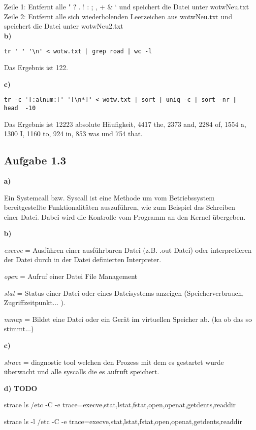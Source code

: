 \documentclass[a4paper,graphics,11pt]{article}
\newcommand{\aufgabe}[1]{\subsection*{Aufgabe #1}}
\begin{document}
Zeile 1: Entfernt alle " ? . ! : ; , +  \& ‘  und speichert die Datei unter wotwNeu.txt\\
Zeile 2: Entfernt alle sich wiederholenden Leerzeichen aus wotwNeu.txt und speichert die Datei unter wotwNeu2.txt\\


\textbf{b)}

\begin{verbatim}
tr ' ' '\n' < wotw.txt | grep road | wc -l
\end{verbatim}



Das Ergebnis ist 122.

\textbf{c)}

\begin{verbatim}
tr -c '[:alnum:]' '[\n*]' < wotw.txt | sort | uniq -c | sort -nr | head  -10
\end{verbatim}


Das Ergebnis ist 12223 absolute Häufigkeit, 4417 the, 2373 and, 2284 of, 1554 a, 1300 I, 1160 to, 924 in, 853 was und 754 that.

\aufgabe{1.3}
\textbf{a)}

Ein Systemcall bzw. Syscall ist eine Methode um vom Betriebssystem bereitgestellte Funktionalitäten auszuführen, wie zum Beispiel das Schreiben einer Datei. Dabei wird die Kontrolle vom Programm an den Kernel übergeben.

\textbf{b)}

\textit{execve} = Ausführen einer ausführbaren Datei (z.B. .out Datei) oder interpretieren der Datei durch in der Datei definierten Interpreter.

\textit{open} = Aufruf einer Datei File Management

\textit{stat} = Status einer Datei oder eines Dateisystems anzeigen (Speicherverbrauch, Zugriffzeitpunkt... ).

\textit{mmap} = Bildet eine Datei oder ein Gerät im virtuellen Speicher ab. (ka ob das so stimmt...)


\textbf{c)}

\textit{strace} = diagnostic tool welchen den Prozess mit dem es gestartet wurde überwacht und alle syscalls die es aufruft speichert.

\textbf{d)}
\textbf{TODO}

strace ls /etc -C -e trace=execve,stat,lstat,fstat,open,openat,getdents,readdir

strace ls -l /etc -C -e trace=execve,stat,lstat,fstat,open,openat,getdents,readdir
\end{document}
